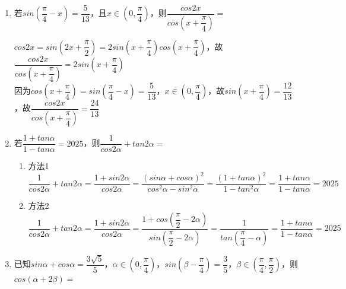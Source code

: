 \begin{enumerate}
\begin{enumerate}
\begin{jieda}
        \end{jieda}
        \item 若$sin(\dfrac{\pi}{4} - x) = \dfrac{5}{13}$，且$x \in (0, \dfrac{\pi}{4})$，则$\dfrac{cos2x}{cos(x+\dfrac{\pi}{4})} = $
        \begin{jieda}
            $cos2x = sin(2x+\dfrac{\pi}{2}) = 2sin(x+\dfrac{\pi}{4})cos(x+\dfrac{\pi}{4})$，故$\dfrac{cos2x}{cos(x+\dfrac{\pi}{4})} = 2sin(x+\dfrac{\pi}{4})$ \\
            因为$cos(x+\dfrac{\pi}{4}) = sin(\dfrac{\pi}{4} - x) = \dfrac{5}{13}$，$x \in (0, \dfrac{\pi}{4})$，故$sin(x+\dfrac{\pi}{4}) = \dfrac{12}{13}$，故$\dfrac{cos2x}{cos(x+\dfrac{\pi}{4})} = \dfrac{24}{13}$
        \end{jieda}
        \item 若$\dfrac{1+tan\alpha}{1-tan\alpha} = 2025$，则$\dfrac{1}{cos2\alpha} + tan2\alpha = $
        \begin{jieda}
            \begin{enumerate}
                \item 方法1 \\
                $\dfrac{1}{cos2\alpha} + tan2\alpha = \dfrac{1+sin2\alpha}{cos2\alpha} = \dfrac{(sin\alpha+cos\alpha)^2}{cos^2\alpha - sin^2\alpha} = \dfrac{(1+tan\alpha)^2}{1 - tan^2\alpha} = \dfrac{1+tan\alpha}{1-tan\alpha} = 2025$
                \item 方法2 \\
                $\dfrac{1}{cos2\alpha} + tan2\alpha = \dfrac{1+sin2\alpha}{cos2\alpha} = \dfrac{1+cos(\dfrac{\pi}{2} - 2\alpha)}{sin(\dfrac{\pi}{2} - 2\alpha)} = \dfrac{1}{tan(\dfrac{\pi}{4} - \alpha)} = \dfrac{1+tan\alpha}{1-tan\alpha} = 2025$
            \end{enumerate}
        \end{jieda}
         \item 已知$sin\alpha + cos\alpha = \dfrac{3\sqrt{5}}{5}$，$\alpha \in \left(0, \dfrac{\pi}{4}\right)$，$sin\left(\beta - \dfrac{\pi}{4}\right) = \dfrac{3}{5}$，$\beta \in \left(\dfrac{\pi}{4}, \dfrac{\pi}{2}\right)$，则$cos(\alpha + 2\beta) = $
\end{enumerate}
\end{enumerate}
